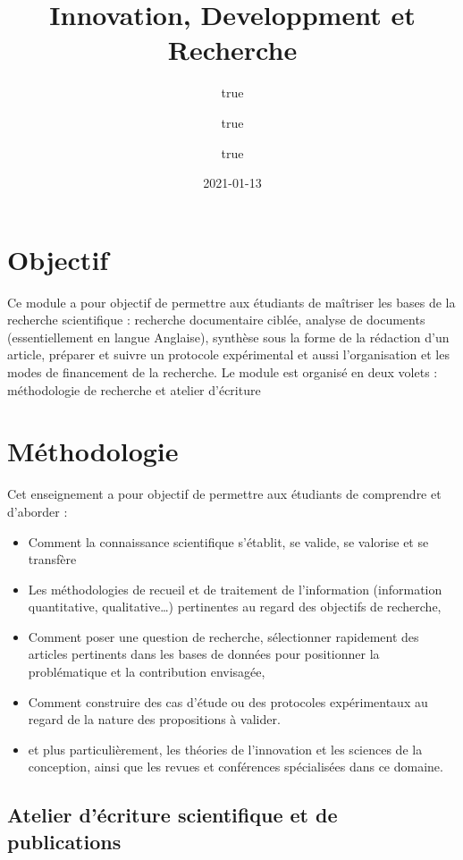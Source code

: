\documentclass[
]{book}
\title{Innovation, Developpment et Recherche}
\author{true \and true \and true}
\date{2021-01-13}
\providecommand{\tightlist}{%
  \setlength{\itemsep}{0pt}\setlength{\parskip}{0pt}}
\begin{document}
\maketitle

{
\setcounter{tocdepth}{1}
\tableofcontents
}
\hypertarget{objectif}{%
\chapter{Objectif}\label{objectif}}

Ce module a pour objectif de permettre aux étudiants de maîtriser les bases de la recherche scientifique : recherche documentaire ciblée, analyse de documents (essentiellement en langue Anglaise), synthèse sous la forme de la rédaction d'un article, préparer et suivre un protocole expérimental et aussi l'organisation et les modes de financement de la recherche. Le module est organisé en deux volets : méthodologie de recherche et atelier d'écriture

\hypertarget{muxe9thodologie}{%
\chapter{Méthodologie}\label{muxe9thodologie}}

Cet enseignement a pour objectif de permettre aux étudiants de comprendre et d'aborder :

\begin{itemize}
\tightlist
\item
  Comment la connaissance scientifique s'établit, se valide, se valorise et se transfère
\item
  Les méthodologies de recueil et de traitement de l'information (information quantitative, qualitative\ldots) pertinentes au regard des objectifs de recherche,
\item
  Comment poser une question de recherche, sélectionner rapidement des articles pertinents dans les bases de données pour positionner la problématique et la contribution envisagée,
\item
  Comment construire des cas d'étude ou des protocoles expérimentaux au regard de la nature des propositions à valider.
\item
  et plus particulièrement, les théories de l'innovation et les sciences de la conception, ainsi que les revues et conférences spécialisées dans ce domaine.
\end{itemize}

\hypertarget{atelier-duxe9criture-scientifique-et-de-publications}{%
\section{Atelier d'écriture scientifique et de publications}\label{atelier-duxe9criture-scientifique-et-de-publications}}
\end{document}
